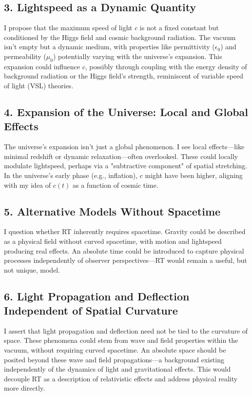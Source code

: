 \documentclass[a4paper,12pt]{article}
\begin{document}
		\subsection{3. Lightspeed as a Dynamic Quantity}
		I propose that the maximum speed of light \( c \) is not a fixed constant but conditioned by the Higgs field and cosmic background radiation. The vacuum isn’t empty but a dynamic medium, with properties like permittivity (\( \epsilon_0 \)) and permeability (\( \mu_0 \)) potentially varying with the universe’s expansion. This expansion could influence \( c \), possibly through coupling with the energy density of background radiation or the Higgs field’s strength, reminiscent of variable speed of light (VSL) theories.
		
		\subsection{4. Expansion of the Universe: Local and Global Effects}
		The universe’s expansion isn’t just a global phenomenon. I see local effects—like minimal redshift or dynamic relaxation—often overlooked. These could locally modulate lightspeed, perhaps via a "subtractive component" of spatial stretching. In the universe’s early phase (e.g., inflation), \( c \) might have been higher, aligning with my idea of \( c(t) \) as a function of cosmic time.
		
		\subsection{5. Alternative Models Without Spacetime}
		I question whether RT inherently requires spacetime. Gravity could be described as a physical field without curved spacetime, with motion and lightspeed producing real effects. An absolute time could be introduced to capture physical processes independently of observer perspectives—RT would remain a useful, but not unique, model.
		
		\subsection{6. Light Propagation and Deflection Independent of Spatial Curvature}
		I assert that light propagation and deflection need not be tied to the curvature of space. These phenomena could stem from wave and field properties within the vacuum, without requiring curved spacetime. An absolute space should be posited beyond these wave and field propagations—a background existing independently of the dynamics of light and gravitational effects. This would decouple RT as a description of relativistic effects and address physical reality more directly.
		
\end{document}
